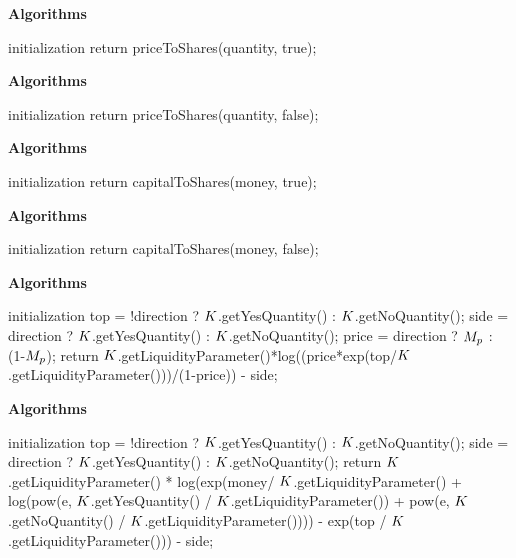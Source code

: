 \textbf{Algorithms}

\begin{algorithm}[H]
\SetAlgoLined
{}
initialization\;
return priceToShares(quantity, true);
\end{algorithm}

\textbf{Algorithms}
\begin{algorithm}[H]
\SetAlgoLined
{}
initialization\;
return priceToShares(quantity, false);
\end{algorithm}

\textbf{Algorithms}
\begin{algorithm}[H]
\SetAlgoLined
{}
initialization\;
return capitalToShares(money, true);
\end{algorithm}

\textbf{Algorithms}
\begin{algorithm}[H]
\SetAlgoLined
{}
initialization\;
return capitalToShares(money, false);
\end{algorithm}

\textbf{Algorithms}
\begin{algorithm}[H]
\SetAlgoLined
{}
initialization\;
top = !direction ? $K$.getYesQuantity() : $K$.getNoQuantity();
side = direction ? $K$.getYesQuantity() : $K$.getNoQuantity();
price = direction ? $M_p$ : (1-$M_p$);
return $K$.getLiquidityParameter()*log((price*exp(top/$K$.getLiquidityParameter()))/(1-price)) - side;
\end{algorithm}

\textbf{Algorithms}
\begin{algorithm}[H]
\SetAlgoLined
{}
initialization\;
top = !direction ? $K$.getYesQuantity() : $K$.getNoQuantity();
side = direction ? $K$.getYesQuantity() : $K$.getNoQuantity();
return $K$.getLiquidityParameter() * log(exp(money/ $K$.getLiquidityParameter() + log(pow(e, $K$.getYesQuantity() / $K$.getLiquidityParameter()) + pow(e, $K$.getNoQuantity() / $K$.getLiquidityParameter()))) - exp(top / $K$.getLiquidityParameter())) - side;
\end{algorithm}

